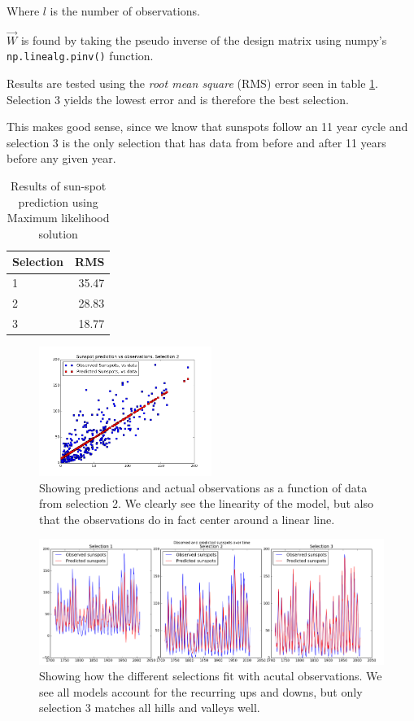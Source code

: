 \documentclass{article}
\theoremstyle{dotless}
\begin{document}
Where $l$ is the number of observations.

$\vec{W}$ is found by taking the pseudo inverse of the design matrix using numpy's \texttt{np.linealg.pinv()} function.

Results are tested using the \emph{root mean square} (RMS) error seen in table \ref{result2.1}. Selection 3 yields the lowest error and is therefore the best selection.

This makes good sense, since we know that sunspots follow an 11 year cycle and selection 3 is the only selection that has data from before and after 11 years before any given year.

\begin{table}[h]
\centering
\label{result2.1}
    \begin{tabular}{l| r}
        Selection & RMS \\ \hline
        1 & 35.47 \\
        2 & 28.83 \\
        3 & 18.77
    \end{tabular}
\caption{Results of sun-spot prediction using Maximum likelihood solution}
\end{table}

\begin{figure}[h]
    \centering
    \includegraphics[width=0.5\textwidth]{src/img/predictions_over_obs.png}
    \caption{Showing predictions and actual observations as a function of data from selection 2. We clearly see the linearity of the model, but also that the observations do in fact center around a linear line.}
    \label{fig:pred_obs}
\end{figure}

\begin{figure}[h]
    \centering
    \includegraphics[width=\textwidth]{src/img/obs_over_time}
    \caption{Showing how the different selections fit with acutal observations. We see all models account for the recurring ups and downs, but only selection 3 matches all hills and valleys well.}
    \label{fig:obs_time}
\end{figure}
\end{document}
